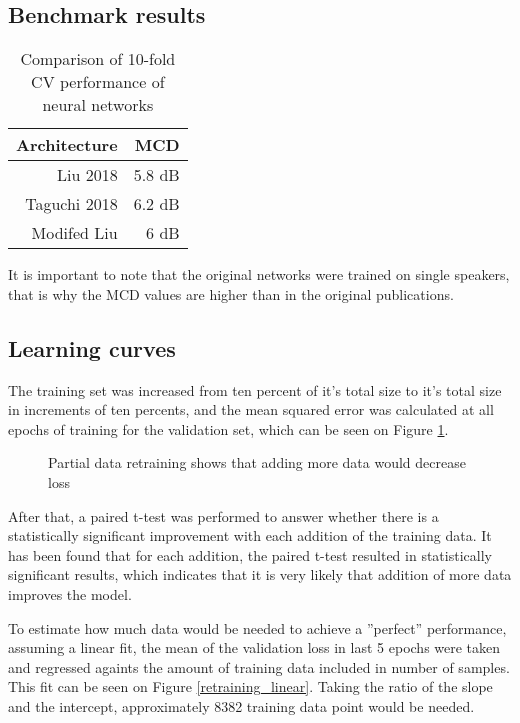 \documentclass[a4paper]{article}
\begin{document}
\subsection{Benchmark results}
\begin{table}[th]
  \caption{Comparison of 10-fold CV performance of neural networks}
  \label{tab:example1}
  \centering
  \begin{tabular}{ r r }
    \toprule
    \textbf{Architecture} & \textbf{MCD} \\
    \midrule
    Liu 2018 & 5.8 dB \\
    Taguchi 2018 & 6.2 dB               \\
    Modifed Liu & 6 dB               \\
    \bottomrule
  \end{tabular}
  
\end{table}

It is important to note that the original networks were trained on
single speakers, that is why the MCD values are higher than in the
original publications.


\subsection{Learning curves}

The training set was increased from ten percent of it's total size to it's
total size in increments of ten percents, and the mean squared error
was calculated at all epochs of training for the validation set, which
can be seen on Figure \ref{learning_curve}.

\begin{figure}[t]
  \begin{center}
    \scalebox{0.50}{}
    \caption{Partial data retraining shows that adding more data would
      decrease loss}
      \label{learning_curve}
\end{center}
\end{figure}


After that, a paired t-test was performed to answer whether there is
a statistically significant improvement with each addition of the training data.
It has been found that for each addition, the paired t-test resulted in statistically
significant results, which indicates that it is very likely that addition
of more data improves the model.

To estimate how much data would be needed to achieve a ''perfect'' performance,
assuming a linear fit, the mean of the validation loss in last 5 epochs
were taken and regressed againts the amount of training data included in
number of samples. This fit can be seen on Figure \ref{retraining_linear}.
Taking the ratio of the slope and the intercept, approximately 8382
training data point would be needed.
\end{document}
